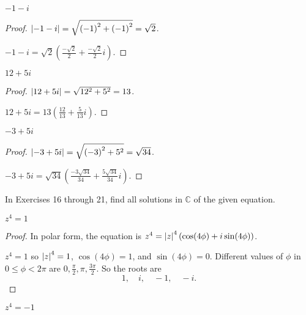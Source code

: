 \newpage
\begin{exercise}
    $-1 - i$
\end{exercise}

\begin{proof}
    $\left\vert{-1 - i}\right\vert = \sqrt{{(-1)}^{2} + {(-1)}^{2}} = \sqrt{2}$.

    $-1 - i = \sqrt{2}\left(\frac{-\sqrt{2}}{2} + \frac{-\sqrt{2}}{2}i\right)$.
\end{proof}

\newpage
\begin{exercise}
    $12 + 5i$
\end{exercise}

\begin{proof}
    $\left\vert{12 + 5i}\right\vert = \sqrt{12^{2} + 5^{2}} = 13$.

    $12 + 5i = 13\left( \frac{12}{13} + \frac{5}{13}i \right)$.
\end{proof}

\newpage
\begin{exercise}
    $-3 + 5i$
\end{exercise}

\begin{proof}
    $\left\vert{-3 + 5i}\right\vert = \sqrt{{(-3)}^{2} + 5^{2}} = \sqrt{34}$.

    $-3 + 5i = \sqrt{34}\left( \frac{-3\sqrt{34}}{34} + \frac{5\sqrt{34}}{34}i \right)$.
\end{proof}

In Exercises 16 through 21, find all solutions in $\mathbb{C}$ of the given equation.

\newpage
\begin{exercise}
    $z^{4} = 1$
\end{exercise}

\begin{proof}
    In polar form, the equation is $z^{4} = \left\vert{z}\right\vert^{4}(\cos (4\phi) + i\sin (4\phi))$.

    $z^{4} = 1$ so $\left\vert{z}\right\vert^{4} = 1$, $\cos(4\phi) = 1$, and $\sin(4\phi) = 0$. Different values of $\phi$ in $0\le \phi < 2\pi$ are $0, \frac{\pi}{2}, \pi, \frac{3\pi}{2}$. So the roots are
    \[
        1,\quad i,\quad -1,\quad -i.
    \]
\end{proof}

\newpage
\begin{exercise}
    $z^{4} = -1$
\end{exercise}


